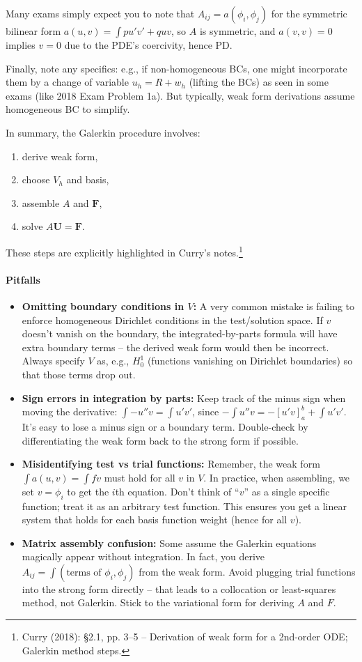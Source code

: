 \documentclass[a4paper,11pt]{article}
\begin{document}
Many exams simply expect you to note that $A_{ij}=a(\phi_i,\phi_j)$ for the symmetric bilinear form $a(u,v)=\int pu'v' + quv$, so $A$ is symmetric, and $a(v,v)=0$ implies $v=0$ due to the PDE's coercivity, hence PD.

Finally, note any specifics: e.g., if non-homogeneous BCs, one might incorporate them by a change of variable $u_h = R + w_h$ (lifting the BCs) as seen in some exams (like 2018 Exam Problem 1a). But typically, weak form derivations assume homogeneous BC to simplify.

In summary, the Galerkin procedure involves:
\begin{enumerate}[label=(\roman{*})]
    \item derive weak form,
    \item choose $V_h$ and basis,
    \item assemble $A$ and $\mathbf{F}$,
    \item solve $A\mathbf{U}=\mathbf{F}$.
\end{enumerate}

These steps are explicitly highlighted in Curry's notes.\footnote{Curry (2018): §2.1, pp. 3--5 -- Derivation of weak form for a 2nd-order ODE; Galerkin method steps.}
\paragraph{Pitfalls}
\begin{itemize}
    \item \textbf{Omitting boundary conditions in $V$:} A very common mistake is failing to enforce homogeneous Dirichlet conditions in the test/solution space. If $v$ doesn't vanish on the boundary, the integrated-by-parts formula will have extra boundary terms -- the derived weak form would then be incorrect. Always specify $V$ as, e.g., $H^1_0$ (functions vanishing on Dirichlet boundaries) so that those terms drop out.
    \item \textbf{Sign errors in integration by parts:} Keep track of the minus sign when moving the derivative: $\int -u''v = \int u'v'$, since $- \int u''v = -[u'v]_a^b + \int u'v'$. It's easy to lose a minus sign or a boundary term. Double-check by differentiating the weak form back to the strong form if possible.
    \item \textbf{Misidentifying test vs trial functions:} Remember, the weak form $\int a(u,v) = \int f v$ must hold for all $v$ in $V$. In practice, when assembling, we set $v=\phi_i$ to get the $i$th equation. Don't think of ``$v$'' as a single specific function; treat it as an arbitrary test function. This ensures you get a linear system that holds for each basis function weight (hence for all $v$).
    \item \textbf{Matrix assembly confusion:} Some assume the Galerkin equations magically appear without integration. In fact, you derive $A_{ij} = \int (\text{terms of }\phi_i,\phi_j)$ from the weak form. Avoid plugging trial functions into the strong form directly -- that leads to a collocation or least-squares method, not Galerkin. Stick to the variational form for deriving $A$ and $F$.
\end{itemize}
\end{document}
